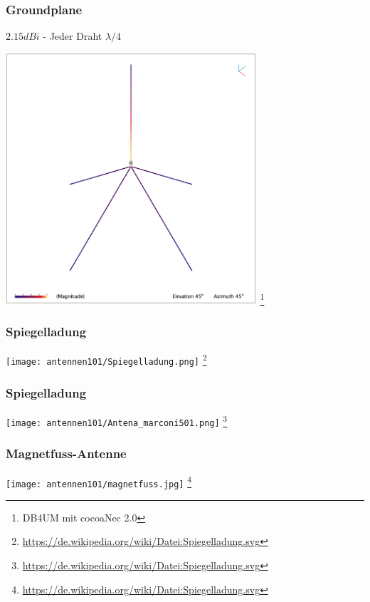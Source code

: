\begin{frame}
    \frametitle{Groundplane}
    $2.15dBi$ - Jeder Draht $\lambda / 4$
    \begin{center}
        \includegraphics[width=0.7\textwidth]{e11/GP-DB4UM.png}
        \footnote{\tiny DB4UM mit cocoaNec 2.0}
	\end{center}
\end{frame}

\begin{frame}
    \frametitle{Spiegelladung}
    \begin{center}
        \texttt{[image: antennen101/Spiegelladung.png]}
                \footnote{\tiny \url{https://de.wikipedia.org/wiki/Datei:Spiegelladung.svg}}
	\end{center}
\end{frame}

\begin{frame}
    \frametitle{Spiegelladung}
    \begin{center}
        \texttt{[image: antennen101/Antena\_marconi501.png]}
                \footnote{\tiny \url{https://de.wikipedia.org/wiki/Datei:Spiegelladung.svg}}
	\end{center}
\end{frame}

\begin{frame}
    \frametitle{Magnetfuss-Antenne}
    \begin{center}
        \texttt{[image: antennen101/magnetfuss.jpg]}
                \footnote{\tiny \url{https://de.wikipedia.org/wiki/Datei:Spiegelladung.svg}}
	\end{center}
\end{frame}

